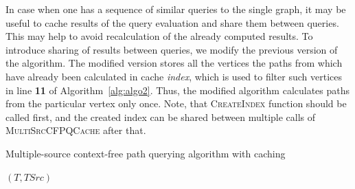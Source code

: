 In case when one has a sequence of similar queries to the single graph, it may be useful to cache results of the query evaluation and share them between queries.
This may help to avoid recalculation of the already computed results.
To introduce sharing of results between queries, we modify the previous version of the algorithm.
The modified version stores all the vertices the paths from which have already been calculated in cache \textit{index}, which is used to filter such vertices in line \textbf{11} of Algorithm~\ref{alg:algo2}.
Thus, the modified algorithm calculates paths from the particular vertex only once.
Note, that \textsc{CreateIndex} function should be called first, and the created index can be shared between multiple calls of \textsc{MultiSrcCFPQCache} after that.

\begin{algorithm}
\small
\begin{algorithmic}[1]
\caption{Multiple-source context-free path querying algorithm with caching}
\label{alg:algo2}


     
        \EndFor
    \EndFor

    \State \Return $(T, TSrc)$
\EndFunction
\State
{}


    \EndFor
    

\end{algorithmic}
\end{algorithm}
